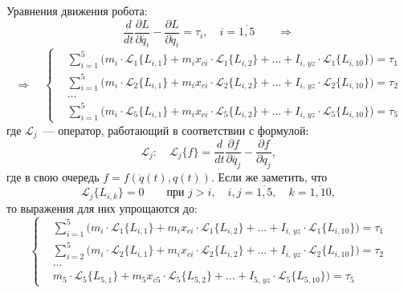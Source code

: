 Уравнения движения робота:
\begin{equation}
    \frac{d}{dt}\frac{\partial L}{\partial\dot{q_i}} - \frac{\partial L}{\partial q_i} = \tau_i, \quad i = \overline{1,5} \qquad \Rightarrow
\end{equation}
\begin{equation}
    \Rightarrow \quad
	\left\{
	\begin{aligned}
		\!&\sum_{i=1}^5 \bigl( m_i \cdot \mathcal{L}_1 \{L_{i,1}\} + m_i x_{ci} \cdot \mathcal{L}_1 \{L_{i,2}\} + \ldots + I_{i,\,yz} \cdot \mathcal{L}_1 \{L_{i,10}\} \bigr) = \tau_1\\
		\!&\sum_{i=1}^5 \bigl( m_i \cdot \mathcal{L}_2 \{L_{i,1}\} + m_i x_{ci} \cdot \mathcal{L}_2 \{L_{i,2}\} + \ldots + I_{i,\,yz} \cdot \mathcal{L}_2 \{L_{i,10}\} \bigr) = \tau_2\\
		\!&\ldots\\
		\!&\sum_{i=1}^5 \bigl( m_i \cdot \mathcal{L}_5 \{L_{i,1}\} + m_i x_{ci} \cdot \mathcal{L}_5 \{L_{i,2}\} + \ldots + I_{i,\,yz} \cdot \mathcal{L}_5 \{L_{i,10}\} \bigr) = \tau_5
	\end{aligned}
	\right.
\end{equation}
где $\mathcal{L}_j$~--- оператор, работающий в соответствии с формулой:
\begin{equation}
    \mathcal{L}_j : \quad \mathcal{L}_j \{f\} = \frac{d}{dt}\frac{\partial f}{\partial\dot{q_j}} - \frac{\partial f}{\partial q_j},
\end{equation}
где в свою очередь $f = f(\dot{q}(t), q(t))$.
Если же заметить, что
\begin{equation}
    \mathcal{L}_j \{L_{i,k}\} = 0 \qquad \text{при }j > i, \quad i,j=\overline{1,5}, \quad k=\overline{1,10},
\end{equation}
то выражения для них упрощаются до:
\begin{equation}
	\left\{
	\begin{aligned}
		\!&\sum_{i=1}^5 \bigl( m_i \cdot \mathcal{L}_1 \{L_{i,1}\} + m_i x_{ci} \cdot \mathcal{L}_1 \{L_{i,2}\} + \ldots + I_{i,\,yz} \cdot \mathcal{L}_1 \{L_{i,10}\} \bigr) = \tau_1\\
		\!&\sum_{i=2}^5 \bigl( m_i \cdot \mathcal{L}_2 \{L_{i,1}\} + m_i x_{ci} \cdot \mathcal{L}_2 \{L_{i,2}\} + \ldots + I_{i,\,yz} \cdot \mathcal{L}_2 \{L_{i,10}\} \bigr) = \tau_2\\
		\!&\ldots\\
		\!& m_5 \cdot \mathcal{L}_5 \{L_{5,1}\} + m_5 x_{c5} \cdot \mathcal{L}_5 \{L_{5,2}\} + \ldots + I_{5,\,yz} \cdot \mathcal{L}_5 \{L_{5,10}\} \bigr) = \tau_5
	\end{aligned}
	\right.
\end{equation}
